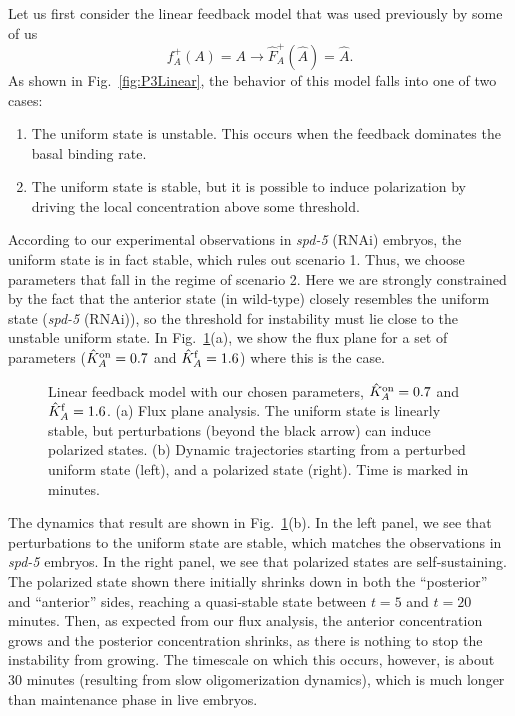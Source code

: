 \documentclass[11pt]{article}
\newcommand{\6}[1]{#1_{\text{6}}}
\newcommand{\3}[1]{#1_{\text{3}}}
\begin{document}
Let us first consider the linear feedback model that was used previously by some of us \cite{lang2022oligomerization}
\begin{equation}
\label{eq:LinFeed}
f_A^+(A)=A \rightarrow \hat F_A^+(\hat A)=\hat A.
\end{equation}
As shown in Fig.\ \ref{fig:P3Linear}, the behavior of this model falls into one of two cases:
\begin{enumerate}
\item The uniform state is unstable. This occurs when the feedback dominates the basal binding rate. 
\item The uniform state is stable, but it is possible to induce polarization by driving the local concentration above some threshold. 
\end{enumerate}
According to our experimental observations in \textit{spd-5} (RNAi) embryos, the uniform state is in fact stable, which rules out scenario 1. Thus, we choose parameters that fall in the regime of scenario 2. Here we are strongly constrained by the fact that the anterior state (in wild-type) closely resembles the uniform state (\textit{spd-5} (RNAi)), so the threshold for instability must lie close to the unstable uniform state. In Fig.\ \ref{fig:LinChoice}(a), we show the flux plane for a set of parameters ($\hat{K}^\text{on}_A=0.7$ and $\hat{K}^\text{f}_A=1.6$) where this is the case. 

\begin{figure}
\centering
{}
\caption{\label{fig:LinChoice}Linear feedback model with our chosen parameters, $\hat{K}^\text{on}_A=0.7$ and $\hat{K}^\text{f}_A=1.6$. (a) Flux plane analysis. The uniform state is linearly stable, but perturbations (beyond the black arrow) can induce polarized states. (b) Dynamic trajectories starting from a perturbed uniform state (left), and a polarized state (right). Time is marked in minutes.}
\end{figure}

The dynamics that result are shown in Fig.\ \ref{fig:LinChoice}(b). In the left panel, we see that perturbations to the uniform state are stable, which matches the observations in \emph{spd-5} embryos. In the right panel, we see that polarized states are self-sustaining. The polarized state shown there initially shrinks down in both the ``posterior'' and ``anterior'' sides, reaching a quasi-stable state between $t=5$ and $t=20$ minutes. Then, as expected from our flux analysis, the anterior concentration grows and the posterior concentration shrinks, as there is nothing to stop the instability from growing. The timescale on which this occurs, however, is about 30 minutes (resulting from slow oligomerization dynamics), which is much longer than maintenance phase in live embryos. 
\end{document}
